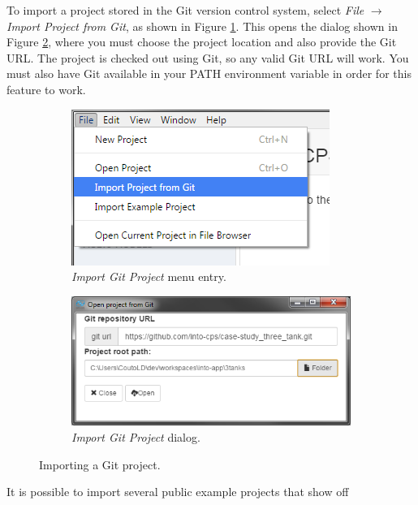 To import a project stored in the Git version control system, select
\textit{File} $\rightarrow$ \emph{Import Project from Git}, as shown in Figure \ref{fig:gitproj-menu}.
This opens the dialog shown in Figure \ref{fig:gitproj-diag}, where you must
choose the project location and also provide the Git URL. The project is checked
out using Git, so any valid Git URL will work. You must also have Git available
in your PATH environment variable in order for this feature to work.
%
%
%
\begin{figure}
\centering
\begin{subfigure}[b]{0.45\textwidth}
  \includegraphics[width=\textwidth]{figures/app/gitproj-menu}
  \caption{\emph{Import Git Project} menu entry.}
  \label{fig:gitproj-menu}
\end{subfigure}
\quad 
\begin{subfigure}[b]{0.45\textwidth}
  \includegraphics[width=\textwidth]{figures/app/gitproj-diag}
  \caption{\emph{Import Git Project} dialog.} 
  \label{fig:gitproj-diag}
\end{subfigure}
\caption{Importing a Git project.}
\label{fig:gitpro}
\end{figure}
%
%
%
It is possible to import several public example projects that show off
